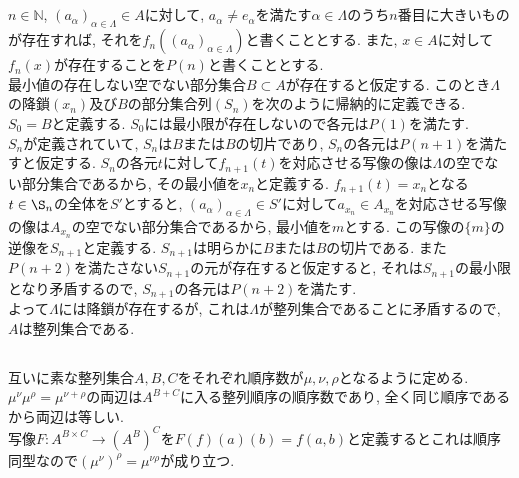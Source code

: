\documentclass{jsarticle}
\begin{document}
\subsection{} %
$n \in \mathbb{N}$, $(a_\alpha)_{\alpha \in \Lambda} \in A$に対して, $a_\alpha \neq e_\alpha$を満たす$\alpha \in \Lambda$のうち$n$番目に大きいものが存在すれば, それを$f_n((a_\alpha)_{\alpha \in \Lambda})$と書くこととする. また, $x \in A$に対して$f_n(x)$が存在することを$P(n)$と書くこととする.\\
最小値の存在しない空でない部分集合$B \subset A$が存在すると仮定する. このとき$\Lambda$の降鎖$(x_n)$及び$B$の部分集合列$(S_n)$を次のように帰納的に定義できる.\\
$S_0 = B$と定義する. $S_0$には最小限が存在しないので各元は$P(1)$を満たす.\\
$S_n$が定義されていて, $S_n$は$B$または$B$の切片であり, $S_n$の各元は$P(n + 1)$を満たすと仮定する. $S_n$の各元$t$に対して$f_{n + 1}(t)$を対応させる写像の像は$\Lambda$の空でない部分集合であるから, その最小値を$x_n$と定義する. $f_{n + 1}(t) = x_n$となる$t \in \S_n$の全体を$S'$とすると, $(a_\alpha)_{\alpha \in \Lambda} \in S'$に対して$a_{x_n} \in A_{x_n}$を対応させる写像の像は$A_{x_n}$の空でない部分集合であるから, 最小値を$m$とする. この写像の$\{m\}$の逆像を$S_{n + 1}$と定義する. $S_{n + 1}$は明らかに$B$または$B$の切片である. また$P(n + 2)$を満たさない$S_{n + 1}$の元が存在すると仮定すると, それは$S_{n + 1}$の最小限となり矛盾するので, $S_{n + 1}$の各元は$P(n + 2)$を満たす.\\
よって$\Lambda$には降鎖が存在するが, これは$\Lambda$が整列集合であることに矛盾するので, $A$は整列集合である.

\subsection{} %
互いに素な整列集合$A, B, C$をそれぞれ順序数が$\mu, \nu, \rho$となるように定める.\\
$\mu^\nu \mu^\rho = \mu^{\nu + \rho}$の両辺は$A^{B + C}$に入る整列順序の順序数であり, 全く同じ順序であるから両辺は等しい.\\
写像$F:A^{B \times C} \rightarrow (A^B)^C$を$F(f)(a)(b) = f(a, b)$と定義するとこれは順序同型なので$(\mu^\nu)^\rho = \mu^{\nu\rho}$が成り立つ.
\end{document}
